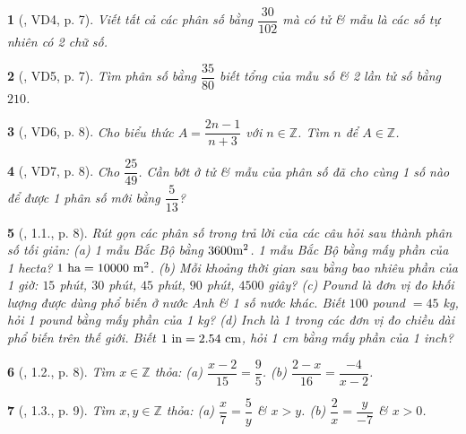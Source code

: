 \documentclass{article}
\newtheorem{baitoan}{}
\begin{document}
\begin{baitoan}[\cite{Binh_boi_duong_Toan_6_tap_2}, VD4, p. 7]
	Viết tất cả các phân số bằng $ \dfrac{30}{102}$ mà có tử \& mẫu là các số tự nhiên có 2 chữ số.
\end{baitoan}

\begin{baitoan}[\cite{Binh_boi_duong_Toan_6_tap_2}, VD5, p. 7]
	Tìm phân số bằng $\dfrac{35}{80}$ biết tổng của mẫu số \& 2 lần tử số bằng $210$.
\end{baitoan}

\begin{baitoan}[\cite{Binh_boi_duong_Toan_6_tap_2}, VD6, p. 8]
	Cho biểu thức $A = \dfrac{2n - 1}{n + 3}$ với $n\in\mathbb{Z}$. Tìm $n$ để $A\in\mathbb{Z}$.
\end{baitoan}

\begin{baitoan}[\cite{Binh_boi_duong_Toan_6_tap_2}, VD7, p. 8]
	Cho $\dfrac{25}{49}$. Cần bớt ở tử \& mẫu của phân số đã cho cùng 1 số nào để được 1 phân số mới bằng $\dfrac{5}{13}$?
\end{baitoan}

\begin{baitoan}[\cite{Binh_boi_duong_Toan_6_tap_2}, 1.1., p. 8]
	Rút gọn các phân số trong trả lời của các câu hỏi sau thành phân số tối giản: (a) 1 mẫu Bắc Bộ bằng $\rm3600 m^2$. 1 mẫu Bắc Bộ bằng mấy phần của 1 hecta? $\rm1\ ha = 10000\ m^2$. (b) Mỗi khoảng thời gian sau bằng bao nhiêu phần của 1 giờ: $15$ phút, $30$ phút, $45$ phút, $90$ phút, $4500$ giây? (c) Pound là đơn vị đo khối lượng được dùng phổ biến ở nước Anh \& 1 số nước khác. Biết $100$ pound $= 45$ {\rm kg}, hỏi 1 pound bằng mấy phần của {\rm1 kg}? (d) Inch là 1 trong các đơn vị đo chiều dài phổ biến trên thế giới. Biết $\rm1\ in = 2.54\ cm$, hỏi {\rm1 cm} bằng mấy phần của {\rm1 inch}?
\end{baitoan}

\begin{baitoan}[\cite{Binh_boi_duong_Toan_6_tap_2}, 1.2., p. 8]
	Tìm $x\in\mathbb{Z}$ thỏa: (a) $\dfrac{x - 2}{15} = \dfrac{9}{5}$. (b) $\dfrac{2 - x}{16} = \dfrac{-4}{x - 2}$.
\end{baitoan}

\begin{baitoan}[\cite{Binh_boi_duong_Toan_6_tap_2}, 1.3., p. 9]
	Tìm $x,y\in\mathbb{Z}$ thỏa: (a) $ \dfrac{x}{7} = \dfrac{5}{y}$ \& $x > y$. (b) $\dfrac{2}{x} = \dfrac{y}{-7}$ \& $x > 0$.
\end{baitoan}
\end{document}
